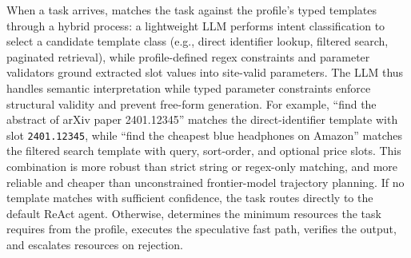 When a task arrives, \sys matches the task against the profile's typed templates through a hybrid process: a lightweight LLM performs intent classification to select a candidate template class (e.g., direct identifier lookup, filtered search, paginated retrieval), while profile-defined regex constraints and parameter validators ground extracted slot values into site-valid parameters. The LLM thus handles semantic interpretation while typed parameter constraints enforce structural validity and prevent free-form generation. For example, ``find the abstract of arXiv paper 2401.12345'' matches the direct-identifier template with slot \texttt{2401.12345}, while ``find the cheapest blue headphones on Amazon'' matches the filtered search template with query, sort-order, and optional price slots. This combination is more robust than strict string or regex-only matching, and more reliable and cheaper than unconstrained frontier-model trajectory planning.
If no template matches with sufficient confidence, the task routes directly to the default ReAct agent. Otherwise, \sys determines the minimum resources the task requires from the profile, executes the speculative fast path, verifies the output, and escalates resources on rejection.


